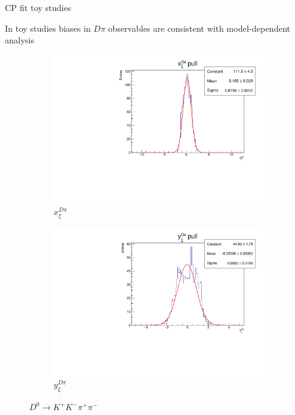 \documentclass[xcolor={dvipsnames}]{beamer}
\begin{document}
\begin{frame}{CP fit toy studies}
  \begin{center}
    In toy studies biases in $D\pi$ observables are consistent with model-dependent analysis
  \end{center}
  \begin{figure}
    \centering
    \begin{subfigure}{0.5\textwidth}
      \centering
      \includegraphics[width=1.0\textwidth]{Plots/A_Re_xi_dpi_pull.pdf}
      \vspace{-0.3cm}
      \caption*{$x_\xi^{D\pi}$}
    \end{subfigure}%
    \begin{subfigure}{0.5\textwidth}
      \centering
      \includegraphics[width=1.0\textwidth]{Plots/A_Im_xi_dpi_pull.pdf}
      \vspace{-0.3cm}
      \caption*{$y_\xi^{D\pi}$}
    \end{subfigure}
    \caption*{$D^0\to K^+K^-\pi^+\pi^-$}
  \end{figure}
\end{frame}
\end{document}
